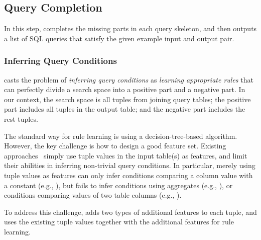 

\subsection{Query Completion}
\label{sec:completion}


In this step, \ourtool completes the missing parts
in each query skeleton, and then
outputs a list of SQL queries
that satisfy the given example input and output pair.




\subsubsection{Inferring Query Conditions}
\label{sec:condition}

\ourtool casts the problem of \textit{inferring query conditions} as
 \textit{learning appropriate rules} that can perfectly divide a search space
into a positive part and a negative part. In our context, the search space
is all tuples from joining query tables; the positive part
includes all tuples in the output table; and the negative part includes the rest
tuples.

The standard way for rule learning is using a decision-tree-based
algorithm. However, the key challenge is how to design a good feature set.
Existing approaches~\cite{Tran:2009} simply use
tuple values in the input table(s) as features, 
and limit their abilities in inferring non-trivial
query conditions. In particular,
merely using tuple values as features can only infer
conditions comparing a column value with a constant
(e.g., ), but
fails to infer conditions using aggregates (e.g., ),
or conditions comparing values of two table columns
(e.g., ).


To address this challenge, \ourtool adds two types of
additional features to each tuple, and uses
the existing tuple values together with the additional features
for rule learning.

